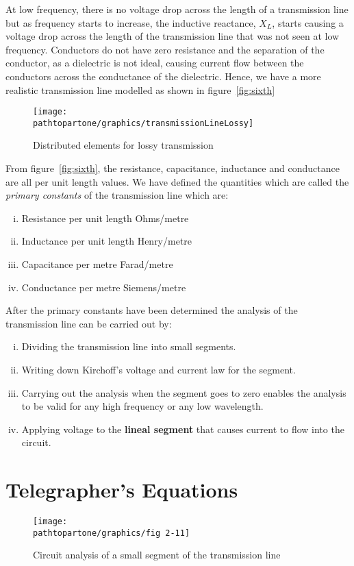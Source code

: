 At low frequency, there is no voltage drop across the length of a transmission line but as frequency starts to increase, the inductive reactance, $X_{L}$, starts causing a voltage drop across the length of the transmission line that was not seen at low frequency. Conductors do not have zero resistance and the separation of the conductor, as a dielectric is not ideal, causing current flow between the conductors across the conductance of the dielectric. Hence, we have a more realistic transmission line modelled as shown in figure~\ref{fig:sixth}
\begin{figure}[h]
\centering
\texttt{[image: \\pathtopartone/graphics/transmissionLineLossy]}
\caption{Distributed elements for lossy transmission}
\label{fig:transmissionLineLossy}
\end{figure}


From figure~\ref{fig:sixth}, the resistance, capacitance, inductance and conductance are all per unit length values. We have defined the quantities which are called the \textit{primary constants} of the transmission line which are:
\begin{enumerate}[(i)]
\item Resistance per unit length \textemdash\; Ohms/metre
\item Inductance per unit length \textemdash\; Henry/metre
\item Capacitance per metre \textemdash\; Farad/metre
\item Conductance per metre \textemdash\; Siemens/metre
\end{enumerate}
After the primary constants have been determined the analysis of the transmission line can be carried out by:

\begin{enumerate}[(i)]
\item Dividing the transmission line into small segments.
\item Writing down Kirchoff's voltage and current law for the segment.
\item Carrying out the analysis when the segment goes to zero enables the analysis to be valid for any high frequency or any low wavelength. 
\item Applying voltage to the \textbf{lineal segment} that causes current to flow into the circuit.
\end{enumerate}

\section{Telegrapher's Equations}
\begin{figure}[h]
\centering
\texttt{[image: \\pathtopartone/graphics/fig 2-11]}
\caption{Circuit analysis of a small segment of the transmission line}
\label{fig:seventh}
\end{figure}

